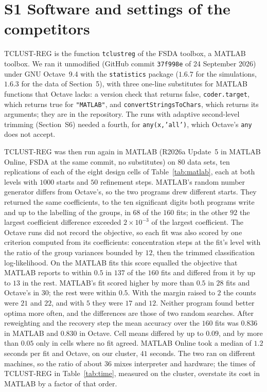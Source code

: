 \section*{S1 Software and settings of the competitors}
\label{supp:software}

TCLUST-REG is the function \texttt{tclustreg} of the FSDA toolbox, a MATLAB toolbox. We ran it
unmodified (GitHub commit \texttt{37f998e} of 24 September 2026) under GNU Octave~9.4 with the
\texttt{statistics} package ($1.6.7$ for the simulations, $1.6.3$ for the data of Section~5),
with three one-line substitutes for MATLAB functions that Octave lacks: a version check that
returns false, \texttt{coder.target}, which returns true for \texttt{"MATLAB"}, and
\texttt{convertStringsToChars}, which returns its arguments; they are in the repository. The runs
with adaptive second-level trimming (Section~S6) needed a fourth, for
\texttt{any(x,'all')}, which Octave's \texttt{any} does not accept.

TCLUST-REG was then run again in MATLAB (R2026a Update~5 in MATLAB Online, FSDA at the same
commit, no substitutes) on $80$ data sets, ten replications of each of the eight design cells of
Table~\ref{tab:matlab}, each at both levels with $1000$ starts and $50$ refinement steps. MATLAB's
random number generator differs from Octave's, so the two programs drew different starts. They
returned the same coefficients, to the ten significant digits both programs write and up to the
labelling of the groups, in $68$ of the $160$ fits; in the other $92$ the largest coefficient
difference exceeded $2\times10^{-3}$ of the largest coefficient. The Octave runs did not record the objective, so each fit was also scored by one criterion computed from its
coefficients: concentration steps at the fit's level with the ratio of the group variances bounded
by $12$, then the trimmed classification log-likelihood. On the MATLAB fits this score equalled
the objective that MATLAB reports to within $0.5$ in $137$ of the $160$ fits and differed from it
by up to $13$ in the rest. MATLAB's fit scored higher by more than
$0.5$ in $28$ fits and Octave's in $30$; the rest were within $0.5$. With the margin raised to $2$ the counts were $21$ and $22$, and
with $5$ they were $17$ and $12$. Neither program found better
optima more often, and the differences are those of two random searches. After reweighting and
the recovery step the mean accuracy over the $160$ fits was $0.836$ in MATLAB and $0.830$ in
Octave. Cell means differed by up to $0.09$, and by more than $0.05$ only in cells where no fit agreed. MATLAB Online took a median of $1.2$ seconds per fit and Octave, on our cluster, $41$ seconds.
The two ran on different machines, so the ratio of about $36$ mixes interpreter and hardware; the
times of TCLUST-REG in Table~\ref{tab:time}, measured on the cluster, overstate its cost in MATLAB
by a factor of that order.

